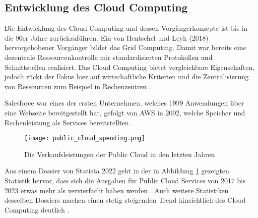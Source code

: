 \subsection{Entwicklung des Cloud Computing}

Die Entwicklung des Cloud Computing und dessen Vorgängerkonzepte ist bis in die 90er Jahre zurückzuführen. Ein von Hentschel und Leyh (2018) hervorgehobener Vorgänger bildet das Grid Computing. Damit war bereits eine dezentrale Ressourcenkontrolle mir standardisierten Protokollen und Schnittstellen realisiert. Das Cloud Computing bietet vergleichbare Eigenschaften, jedoch rückt der Fokus hier auf wirtschaftliche Kriterien und die Zentralisierung von Ressourcen zum Beispiel in Rechenzentren \cite[Vgl.][S. 5f]{Reinheimer2018}.

Salesforce war eines der ersten Unternehmen, welches 1999 Anwendungen über eine Webseite bereitgestellt hat, gefolgt von \ac{AWS} in 2002, welche Speicher und Rechenleistung als Services bereitstellten \cite[Vgl.][S. 17f]{Srivastava2018}.

\begin{figure}[H]
    \texttt{[image: public\_cloud\_spending.png]}
    \caption{Die Verkaufsleistungen der Public Cloud in den letzten Jahren \cite[S. 8]{Statista2022}}
    \label{fig:public_cloud_spending}
\end{figure}

Aus einem Dossier von Statista 2022 geht in der in Abbildung \ref{fig:public_cloud_spending} gezeigten Statistik hervor, dass sich die Ausgaben für Public Cloud Services von 2017 bis 2023 etwas mehr als vervierfacht haben werden \cite[Vgl.][S. 8]{Statista2022}. Auch weitere Statistiken desselben Dossiers machen einen stetig steigenden Trend hinsichtlich des Cloud Computing deutlich \cite[Vgl. unter anderem][S. 11ff]{Statista2022}. \pagebreak
